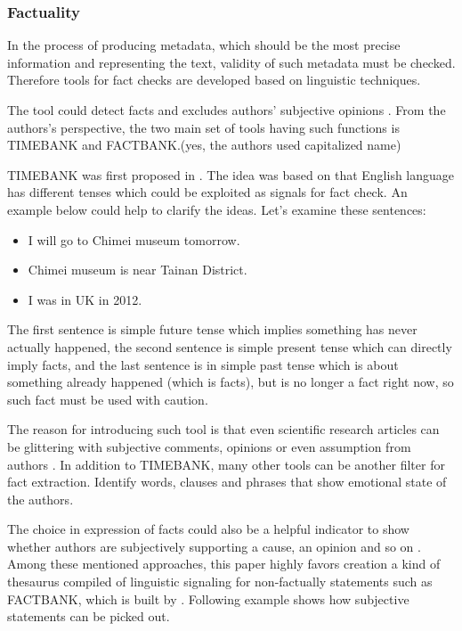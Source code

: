 
\subsubsection*{Factuality}

In the process of producing metadata, which should be the most precise information and representing the text, validity of such metadata must be checked. 
Therefore tools for fact checks are developed based on linguistic techniques. 

The tool could detect facts and excludes authors' subjective opinions \cite{Agerri2014}. 
From the authors's perspective, the two main set of tools having such functions is TIMEBANK and FACTBANK.(yes, the authors used capitalized name)

TIMEBANK was first proposed in \cite{pustejovsky2003timebank}. 
The idea was based on that English language has different tenses which could be exploited as signals for fact check. 
An example below could help to clarify the ideas. Let's examine these sentences:

\begin{itemize}
	\item I will go to Chimei museum tomorrow.
	\item Chimei museum is near Tainan District.
	\item I was in UK in 2012.
\end{itemize}

The first sentence is simple future tense which implies something has never actually happened, the second sentence is simple present tense which can directly imply facts,
and the last sentence is in simple past tense which is about something already happened (which is facts),
but is no longer a fact right now, so such fact must be used with caution. 

The reason for introducing such tool is that even scientific research articles can be glittering with subjective comments, opinions or even assumption from authors \cite{schultze2000confessional}. 
In addition to TIMEBANK, many other tools can be another filter for fact extraction. 
\cite{Dave2003mining} Identify words, clauses and phrases that show emotional state of the authors. 

The choice in expression of facts could also be a helpful indicator to show whether authors are subjectively supporting a cause, an opinion and so on \cite{Wiebe2005}. 
Among these mentioned approaches, this paper highly favors creation a kind of thesaurus compiled of linguistic signaling for non-factually statements such as FACTBANK,
which is built by \cite{Sauri2009}. 
Following example shows how subjective statements can be picked out.

